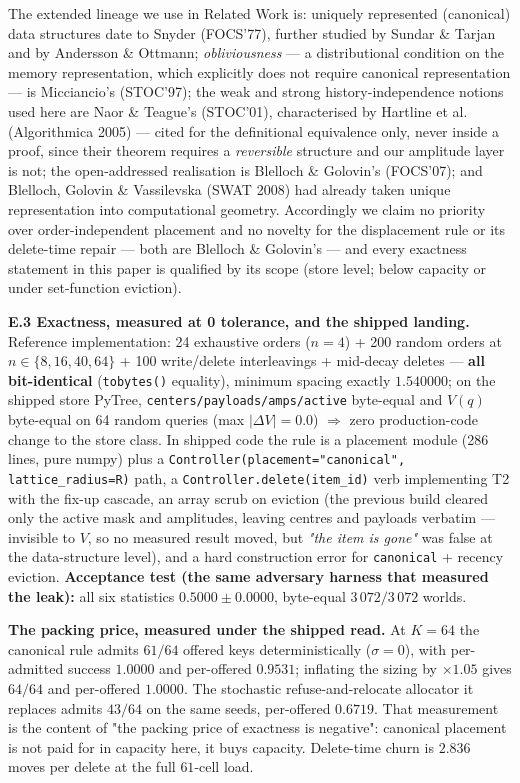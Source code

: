 \documentclass{article}
\begin{document}
The extended lineage we use in Related Work is: uniquely represented (canonical) data structures date to Snyder (FOCS'77), further studied by Sundar \& Tarjan and by Andersson \& Ottmann; \emph{obliviousness} --- a distributional condition on the memory representation, which explicitly does not require canonical representation --- is Micciancio's (STOC'97); the weak and strong history-independence notions used here are Naor \& Teague's (STOC'01), characterised by Hartline et al. (Algorithmica 2005) --- cited for the definitional equivalence only, never inside a proof, since their theorem requires a \emph{reversible} structure and our amplitude layer is not; the open-addressed realisation is Blelloch \& Golovin's (FOCS'07); and Blelloch, Golovin \& Vassilevska (SWAT 2008) had already taken unique representation into computational geometry. Accordingly we claim no priority over order-independent placement and no novelty for the displacement rule or its delete-time repair --- both are Blelloch \& Golovin's --- and every exactness statement in this paper is qualified by its scope (store level; below capacity or under set-function eviction).

\textbf{E.3 Exactness, measured at 0 tolerance, and the shipped landing.} Reference implementation: 24 exhaustive orders ($n=4$) + 200 random orders at $n\in\{8,16,40,64\}$ + 100 write/delete interleavings + mid-decay deletes --- \textbf{all bit-identical} (\texttt{tobytes()} equality), minimum spacing exactly $1.540000$; on the shipped store PyTree, \texttt{centers/payloads/amps/active} byte-equal and $V(q)$ byte-equal on 64 random queries (max $|\Delta V|=0.0$) $\Rightarrow$ zero production-code change to the store class. In shipped code the rule is a placement module (286 lines, pure numpy) plus a \texttt{Controller(placement="canonical", lattice\_radius=R)} path, a \texttt{Controller.delete(item\_id)} verb implementing T2 with the fix-up cascade, an array scrub on eviction (the previous build cleared only the active mask and amplitudes, leaving centres and payloads verbatim --- invisible to $V$, so no measured result moved, but \emph{"the item is gone"} was false at the data-structure level), and a hard construction error for \texttt{canonical} + recency eviction. \textbf{Acceptance test (the same adversary harness that measured the leak):} all six statistics $0.5000\pm0.0000$, byte-equal $3\,072/3\,072$ worlds.

\textbf{The packing price, measured under the shipped read.} At $K=64$ the canonical rule admits $61/64$ offered keys deterministically ($\sigma=0$), with per-admitted success $1.0000$ and per-offered $0.9531$; inflating the sizing by $\times1.05$ gives $64/64$ and per-offered $1.0000$. The stochastic refuse-and-relocate allocator it replaces admits $43/64$ on the same seeds, per-offered $0.6719$. That measurement is the content of "the packing price of exactness is negative": canonical placement is not paid for in capacity here, it buys capacity. Delete-time churn is $2.836$ moves per delete at the full $61$-cell load.
\end{document}
